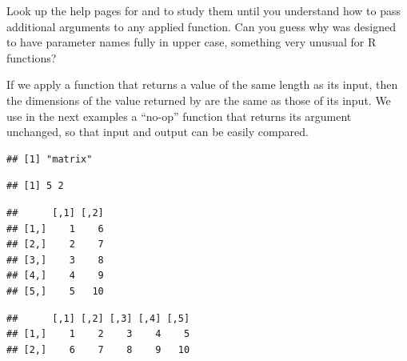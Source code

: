 \documentclass[krantz2,ChapterTOCs]{krantz}\usepackage{knitr}
\begin{document}
\begin{playground}
Look up the help pages for  and  to study them until you understand how to pass additional arguments to any applied function. Can you guess why  was designed to have parameter names fully in upper case, something very unusual for R functions?
\end{playground}

\begin{warningbox}
If we apply a function that returns a value of the same length as its input, then the dimensions of the value returned by  are the same as those of its input. We use in the next examples a ``no-op'' function that returns its argument unchanged, so that input and output can be easily compared.

\begin{knitrout}\footnotesize
{}\color{fgcolor}\begin{kframe}
\begin{alltt}
\hlstd{(}\hlstd{)}
 \hlkwb{<-} \hlstd{(}\hlopt{:}\hlstd{,}  \hlstd{=} \hlstd{)}
 \hlkwb{<-} \hlstd{(}
 \hlkwb{<-} \hlstd{(}   \hlstd{=} \hlstd{,}  
\end{alltt}
\begin{verbatim}
## [1] "matrix"
\end{verbatim}
\begin{alltt}
\end{alltt}
\begin{verbatim}
## [1] 5 2
\end{verbatim}
\begin{alltt}
\end{alltt}
\begin{verbatim}
##      [,1] [,2]
## [1,]    1    6
## [2,]    2    7
## [3,]    3    8
## [4,]    4    9
## [5,]    5   10
\end{verbatim}
\begin{alltt}
\end{alltt}
\begin{verbatim}
##      [,1] [,2] [,3] [,4] [,5]
## [1,]    1    2    3    4    5
## [2,]    6    7    8    9   10
\end{verbatim}
\end{kframe}
\end{knitrout}


\end{warningbox}
\end{document}
